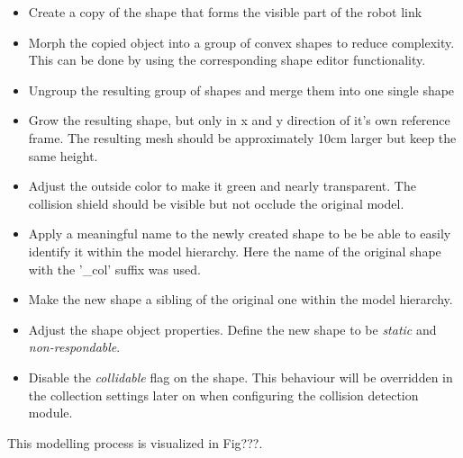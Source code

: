 \begin{itemize}

\item
Create a copy of the shape that forms the visible part of the robot link
\item
Morph the copied object into a group of convex shapes to reduce complexity. This can be done by using the corresponding shape editor functionality.
\item
Ungroup the resulting group of shapes and merge them into one single shape
\item
Grow the resulting shape, but only in x and y direction of it's own reference frame. The resulting mesh should be approximately 10cm larger but keep the same height.
\item
Adjust the outside color to make it green and nearly transparent. The collision shield should be visible but not occlude the original model.
\item
Apply a meaningful name to the newly created shape to be be able to easily identify it within the model hierarchy. Here the name of the original shape with the '\_col' suffix was used.
\item
Make the new shape a sibling of the original one within the model hierarchy.
\item
Adjust the shape object properties. Define the new shape to be \emph{static} and \emph{non-respondable}.
\item
Disable the \emph{collidable} flag on the shape. This behaviour will be overridden in the collection
settings later on when configuring the collision detection module.

\end{itemize}

This modelling process is visualized in Fig???.\\

